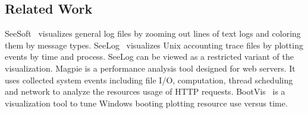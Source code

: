 \subsection{Related Work}
\label{sec:lviz-related}




SeeSoft~\cite{eick1994graphical} visualizes general log files by zooming out
lines of text logs and coloring them by message types.
SeeLog~\cite{eick1996displaying} visualizes Unix accounting trace files by
plotting events by time and process.
SeeLog can be viewed as a restricted variant of the
\VDP{} visualization.
Magpie \cite{barham2004using} is a performance analysis tool designed for web servers.
It uses collected system events including file I/O, computation,
thread scheduling and network to analyze the resources usage of
HTTP requests.
BootVis~\cite{bootvis} 
is a visualization tool to tune
Windows booting plotting resource use versus time.

